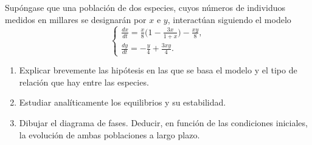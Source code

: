 \documentclass[11pt]{report}
\begin{document}
\begin{exercise}[Junio de 2021]
    Supóngase que una población de dos especies, cuyos números de individuos medidos en millares se designarán por $x$ e $y$, interactúan siguiendo el modelo
    \[\begin{cases}
        \displaystyle \frac{dx}{dt} = \frac{x}{8}\bigl(1-\frac{3x}{1+x}\bigr)-\frac{xy}{8}, \\[10pt]
        \displaystyle \frac{dy}{dt} = -\frac{y}{4}+\frac{3xy}{4}.
    \end{cases}\]
    \begin{enumerate}
        \item Explicar brevemente las hipótesis en las que se basa el modelo y el tipo de relación que hay entre las especies.
        \item Estudiar analíticamente los equilibrios y su estabilidad.
        \item Dibujar el diagrama de fases. Deducir, en función de las condiciones iniciales, la evolución de ambas poblaciones a largo plazo.
    \end{enumerate}
\end{exercise}
\end{document}
